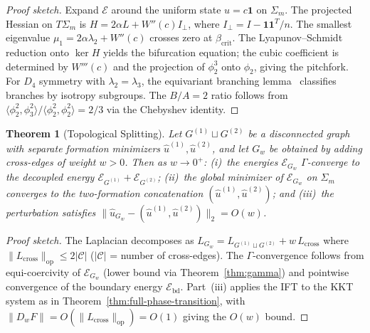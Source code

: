 \documentclass[lettersize,journal]{IEEEtran}
\newtheorem{theorem}{Theorem}
\begin{document}
\begin{proof}[Proof sketch]
Expand $\mathcal{E}$ around the uniform state $u = c\mathbf{1}$ on $\Sigma_m$. The projected Hessian on $T\Sigma_m$ is $H = 2\alpha L + W''(c)I_\perp$, where $I_\perp = I - \mathbf{1}\mathbf{1}^T/n$. The smallest eigenvalue $\mu_1 = 2\alpha\lambda_2 + W''(c)$ crosses zero at $\beta_{\mathrm{crit}}$. The Lyapunov--Schmidt reduction onto $\ker H$ yields the bifurcation equation; the cubic coefficient is determined by $W'''(c)$ and the projection of $\phi_2^3$ onto $\phi_2$, giving the pitchfork. For $D_4$ symmetry with $\lambda_2 = \lambda_3$, the equivariant branching lemma~\cite{GSS1988} classifies branches by isotropy subgroups. The $B/A = 2$ ratio follows from $\langle \phi_2^2, \phi_3^2 \rangle / \langle \phi_2^2, \phi_2^2 \rangle = 2/3$ via the Chebyshev identity.
\end{proof}

\begin{theorem}[Topological Splitting]
\label{thm:topological-splitting}
Let $G^{(1)} \sqcup G^{(2)}$ be a disconnected graph with separate formation minimizers $\hat{u}^{(1)}, \hat{u}^{(2)}$, and let $G_w$ be obtained by adding cross-edges of weight $w > 0$. Then as $w \to 0^+$: (i)~the energies $\mathcal{E}_{G_w}$ $\Gamma$-converge to the decoupled energy $\mathcal{E}_{G^{(1)}} + \mathcal{E}_{G^{(2)}}$; (ii)~the global minimizer of $\mathcal{E}_{G_w}$ on $\Sigma_m$ converges to the two-formation concatenation $(\hat{u}^{(1)}, \hat{u}^{(2)})$; and (iii)~the perturbation satisfies $\|\hat{u}_{G_w} - (\hat{u}^{(1)}, \hat{u}^{(2)})\|_2 = O(w)$.
\end{theorem}

\begin{proof}[Proof sketch]
The Laplacian decomposes as $L_{G_w} = L_{G^{(1)} \sqcup G^{(2)}} + w\,L_{\mathrm{cross}}$ where $\|L_{\mathrm{cross}}\|_{\mathrm{op}} \leq 2|\mathcal{C}|$ ($|\mathcal{C}|$ = number of cross-edges). The $\Gamma$-convergence follows from equi-coercivity of $\mathcal{E}_{G_w}$ (lower bound via Theorem~\ref{thm:gamma}) and pointwise convergence of the boundary energy $\mathcal{E}_{\mathrm{bd}}$. Part~(iii) applies the IFT to the KKT system as in Theorem~\ref{thm:full-phase-transition}, with $\|D_w F\| = O(\|L_{\mathrm{cross}}\|_{\mathrm{op}}) = O(1)$ giving the $O(w)$ bound.
\end{proof}
\end{document}
